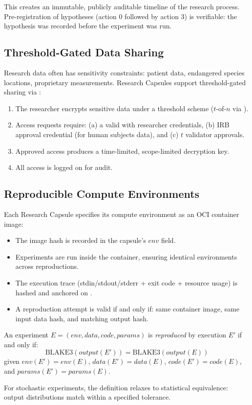 This creates an immutable, publicly auditable timeline of the research process. Pre-registration of hypotheses (action 0 followed by action 3) is verifiable: the hypothesis was recorded before the experiment was run.

\subsection{Threshold-Gated Data Sharing}

Research data often has sensitivity constraints: patient data, endangered species locations, proprietary measurements. Research Capsules support threshold-gated sharing via \TChain{}:

\begin{enumerate}
    \item The researcher encrypts sensitive data under a threshold scheme ($t$-of-$n$ via \TChain{}).
    \item Access requests require: (a) a valid \DID{} with researcher credentials, (b) IRB approval credential (for human subjects data), and (c) $t$ validator approvals.
    \item Approved access produces a time-limited, scope-limited decryption key.
    \item All access is logged on \IChain{} for audit.
\end{enumerate}

\subsection{Reproducible Compute Environments}

Each Research Capsule specifies its compute environment as an OCI container image:

\begin{itemize}
    \item The image hash is recorded in the capsule's $\textit{env}$ field.
    \item Experiments are run inside the container, ensuring identical environments across reproductions.
    \item The execution trace (stdin/stdout/stderr + exit code + resource usage) is hashed and anchored on \IChain{}.
    \item A reproduction attempt is valid if and only if: same container image, same input data hash, and matching output hash.
\end{itemize}

\begin{definition}
An experiment $E = (\textit{env}, \textit{data}, \textit{code}, \textit{params})$ is \emph{reproduced} by execution $E'$ if and only if:
\begin{equation}
\text{BLAKE3}(\textit{output}(E')) = \text{BLAKE3}(\textit{output}(E))
\end{equation}
given $\textit{env}(E') = \textit{env}(E)$, $\textit{data}(E') = \textit{data}(E)$, $\textit{code}(E') = \textit{code}(E)$, and $\textit{params}(E') = \textit{params}(E)$.
\end{definition}

For stochastic experiments, the definition relaxes to statistical equivalence: output distributions match within a specified tolerance.

